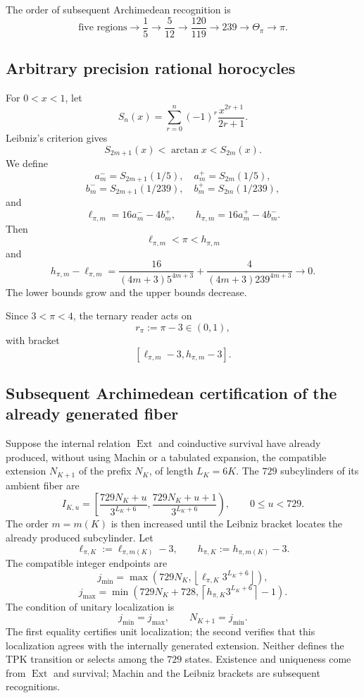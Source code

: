 The order of subsequent Archimedean recognition is
\[
 \text{five regions}
 \to\frac15
 \to\frac5{12}
 \to\frac{120}{119}
 \to239
 \to\Theta_\pi
 \to\pi.
\]

\subsection{Arbitrary precision rational horocycles}

For \(0<x<1\), let
\[
 S_n(x)=\sum_{r=0}^{n}(-1)^r\frac{x^{2r+1}}{2r+1}.
\]
Leibniz's criterion gives
\[
 S_{2m+1}(x)<\arctan x<S_{2m}(x).
\]
We define
\[
 a_m^-=S_{2m+1}(1/5),\quad a_m^+=S_{2m}(1/5),
\]
\[
 b_m^-=S_{2m+1}(1/239),\quad b_m^+=S_{2m}(1/239),
\]
and
\begin{equation}
 \ell_{\pi,m}=16a_m^- -4b_m^+,
 \qquad
 h_{\pi,m}=16a_m^+ -4b_m^-.
 \label{p12-83-c9-s1:eq:horquilla-pi-autonoma}
\end{equation}
Then
\[
 \ell_{\pi,m}<\pi<h_{\pi,m}
\]
and
\begin{equation}
 h_{\pi,m}-\ell_{\pi,m}
 =
 \frac{16}{(4m+3)5^{4m+3}}
 +\frac{4}{(4m+3)239^{4m+3}}
 \longrightarrow0.
 \label{p12-83-c9-s1:eq:anchura-horquilla-pi}
\end{equation}
The lower bounds grow and the upper bounds decrease.

Since \(3<\pi<4\), the ternary reader acts on
\[
 r_\pi:=\pi-3\in(0,1),
\]
with bracket
\[
 [\ell_{\pi,m}-3,h_{\pi,m}-3].
\]

\subsection{Subsequent Archimedean certification of the already generated fiber}

Suppose the internal relation \(\operatorname{Ext}\) and coinductive
survival have already produced, without using Machin or a tabulated expansion,
the compatible extension \(N_{K+1}\) of the prefix \(N_K\), of length
\(L_K=6K\). The \(729\) subcylinders of its ambient fiber are
\[
 I_{K,u}=
 \left[
 \frac{729N_K+u}{3^{L_K+6}},
 \frac{729N_K+u+1}{3^{L_K+6}}
 \right),
 \qquad0\leq u<729.
\]
The order \(m=m(K)\) is then increased until the Leibniz bracket
locates the already produced subcylinder. Let
\[
 \ell_{\pi,K}:=\ell_{\pi,m(K)}-3,
 \qquad
 h_{\pi,K}:=h_{\pi,m(K)}-3.
\]
The compatible integer endpoints are
\[
 j_{\min}=
 \max\!\left(
 729N_K,\left\lfloor
 \ell_{\pi,K}3^{L_K+6}\right\rfloor
 \right),
\]
\[
 j_{\max}=
 \min\!\left(
 729N_K+728,\left\lceil
 h_{\pi,K}3^{L_K+6}\right\rceil-1
 \right).
\]
The condition of unitary localization is
\begin{equation}
 \boxed{j_{\min}=j_{\max},\qquad N_{K+1}=j_{\min}.}
 \label{p12-83-c9-s1:eq:seleccion-unitaria-subcilindro-pi}
\end{equation}
The first equality certifies unit localization; the second verifies
that this localization agrees with the internally generated extension. Neither
defines the TPK transition or selects among the \(729\) states.
Existence and uniqueness come from \(\operatorname{Ext}\) and
survival; Machin and the Leibniz brackets are subsequent
recognitions.

